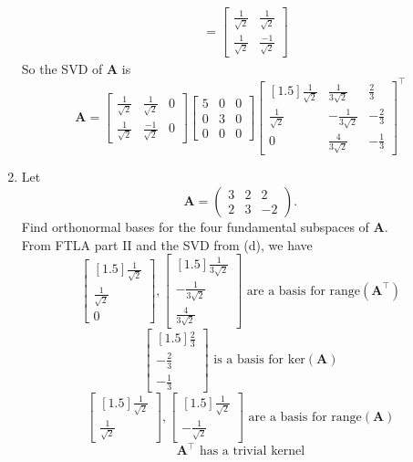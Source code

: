 \documentclass{article}
\begin{document}
\begin{enumerate}[label=(\alph*)]
{\begin{align*}
&= \begin{bmatrix} \frac{1}{\sqrt{2}} & \frac{1}{\sqrt{2}} \\ \frac{1}{\sqrt{2}} & \frac{-1}{\sqrt{2}} \end{bmatrix}
\end{align*} So the SVD of $\mathbf{A}$ is $$\mathbf{A} = \begin{bmatrix} \frac{1}{\sqrt{2}} & \frac{1}{\sqrt{2}} & 0 \\ \frac{1}{\sqrt{2}} & \frac{-1}{\sqrt{2}} & 0 \end{bmatrix}\begin{bmatrix} 5 & 0 & 0 \\ 0 & 3 & 0 \\ 0 & 0 & 0 \end{bmatrix}\begin{bmatrix}[1.5] \frac{1}{\sqrt{2}} & \frac{1}{3\sqrt{2}} & \frac{2}{3} \\ \frac{1}{\sqrt{2}} & -\frac{1}{3\sqrt{2}} & -\frac{2}{3} \\ 0 & \frac{4}{3\sqrt{2}} & -\frac{1}{3} \end{bmatrix}^{\top} $$}
\item Let 
\[
\textbf{A} = \begin{pmatrix}
3 & 2 & 2 \\
2 & 3 & -2
\end{pmatrix}.
\]
Find orthonormal bases for the four fundamental subspaces of $\textbf{A}$. \\
{\color{blue} From FTLA part II and the SVD from (d), we have $$
\begin{bmatrix}[1.5] \frac{1}{\sqrt{2}} \\ \frac{1}{\sqrt{2}} \\ 0 \end{bmatrix}, \begin{bmatrix}[1.5] \frac{1}{3\sqrt{2}} \\ -\frac{1}{3\sqrt{2}} \\ \frac{4}{3\sqrt{2}} \end{bmatrix} \text{ are a basis for range}(\mathbf{A}^{\top})$$ $$
\begin{bmatrix}[1.5] \frac{2}{3} \\ -\frac{2}{3} \\ -\frac{1}{3} \end{bmatrix} \text{ is a basis for ker}(\mathbf{A})$$ $$
\begin{bmatrix}[1.5] \frac{1}{\sqrt{2}} \\ \frac{1}{\sqrt{2}}\end{bmatrix}, \begin{bmatrix}[1.5] \frac{1}{\sqrt{2}} \\ -\frac{1}{\sqrt{2}} \end{bmatrix} \text{ are a basis for range}(\mathbf{A})$$ $$
\mathbf{A^{\top}} \text{ has a trivial kernel}$$}
\end{enumerate}
\end{document}
